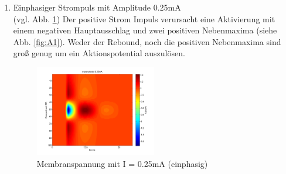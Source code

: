 \documentclass[conference]{IEEEtran}
\begin{document}
\begin{enumerate}
\item Einphasiger Strompuls mit Amplitude 0.25mA\\ (vgl. Abb. \ref{fig:mono_pos_025_1}) Der positive Strom Impuls verursacht eine Aktivierung mit einem negativen Hauptausschlag und zwei positiven Nebenmaxima (siehe Abb. \ref{fig:A1}). Weder der Rebound, noch die positiven Nebenmaxima sind groß genug um ein Aktionspotential auszulösen.
\begin{figure}[h!]
	\centering
	\vspace{-10pt}
	\includegraphics[width=0.5\textwidth]{img/mono_pos_025_1.png}
	\vspace{-30pt}
	\caption{Membranspannung mit I = 0.25mA (einphasig)}
	\vspace{-5pt}
	\label{fig:mono_pos_025_1}
\end{figure}


\end{enumerate}
\end{document}
